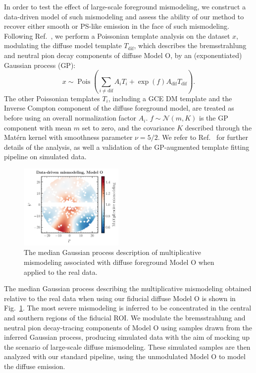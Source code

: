 \documentclass[prd,aps,10pt,nofootinbib,twocolumn,superscriptaddress,preprintnumbers,balancelastpage,longbibliography]{revtex4-1}
\begin{document}
In order to test the effect of large-scale foreground mismodeling, we construct a data-driven model of such mismodeling and assess the ability of our method to recover either smooth or PS-like emission in the face of such mismodeling.  Following Ref.~\cite{Mishra-Sharma:2020kjb}, we perform a Poissonian template analysis on the \Fermi dataset $x$, modulating the diffuse model template $T_{\mathrm{dif}}$, which describes the bremsstrahlung and neutral pion decay components of diffuse Model O, by an (exponentiated) Gaussian process (GP):
\begin{equation}
    x \sim \operatorname{Pois}\left(\sum_{i \neq \mathrm{dif}} A_{i} T_{i}+\exp \left(f\right) A_{\mathrm{dif}} T_{\mathrm{dif}}\right).
\end{equation}
The other Poissonian templates $T_{i}$, including a GCE DM template and the Inverse Compton component of the diffuse foreground model, are treated as before using an overall normalization factor $A_{i}$. $f \sim \mathcal{N}(m, K)$ is the GP component with mean $m$ set to zero, and the covariance $K$ described through the Mat\'ern kernel with smoothness parameter $\nu = 5/2$. We refer to Ref.~\cite{Mishra-Sharma:2020kjb} for further details of the analysis, as well a validation of the GP-augmented template fitting pipeline on simulated data.

%
\begin{figure}
    \centering
    \includegraphics[width=0.45\textwidth]{plots/dd_mismo_map.pdf}
    \caption{The median Gaussian process description of multiplicative mismodeling associated with diffuse foreground Model O when applied to the real \Fermi data.}
    \label{fig:dd_mismo_map}
\end{figure}
%

The median Gaussian process describing the multiplicative mismodeling obtained relative to the real \Fermi data when using our fiducial diffuse Model O is shown in Fig.~\ref{fig:dd_mismo_map}. The most severe mismodeling is inferred to be concentrated in the central and southern regions of the fiducial ROI. We modulate the bremsstrahlung and neutral pion decay-tracing components of Model O using samples drawn from the inferred Gaussian process, producing simulated data with the aim of mocking up the scenario of large-scale diffuse mismodeling. These simulated samples are then analyzed with our standard pipeline, using the unmodulated Model O to model the diffuse emission.
\end{document}
